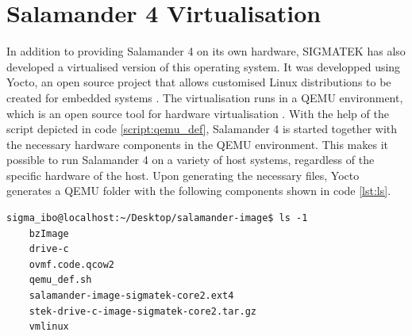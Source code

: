 \documentclass[MMR,Master,english]{twbook}
\begin{document}
\section{Salamander 4 Virtualisation}
In addition to providing Salamander 4 on its own hardware, SIGMATEK has also developed a virtualised version of this operating system. It was developped using Yocto, an open source project that allows customised Linux distributions to be created for embedded systems \cite{WelcomeYoctoProject}. The virtualisation runs in a QEMU environment, which is an open source tool for hardware virtualisation \cite{QEMU}. With the help of the script depicted in code \ref{script:qemu_def}, Salamander 4 is started together with the necessary hardware components in the QEMU environment. This makes it possible to run Salamander 4 on a variety of host systems, regardless of the specific hardware of the host. Upon generating the necessary files, Yocto generates a QEMU folder with the following components shown in code \ref{lst:ls}.

\vspace{1em}
\begin{minipage}{\linewidth}
	\begin{lstlisting}[name={Contents of QEMU folder for Salamander 4},label={lst:ls}]
    sigma_ibo@localhost:~/Desktop/salamander-image$ ls -1
    bzImage
    drive-c
    ovmf.code.qcow2
    qemu_def.sh
    salamander-image-sigmatek-core2.ext4
    stek-drive-c-image-sigmatek-core2.tar.gz
    vmlinux
    \end{lstlisting}
\end{minipage}
\end{document}
